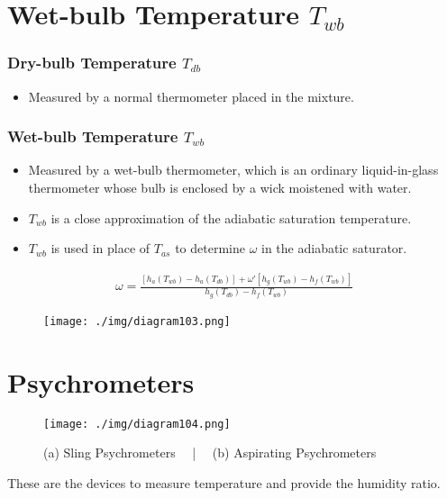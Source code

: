 \section{Wet-bulb Temperature $T_{wb}$}
\subsubsection{Dry-bulb Temperature $T_{db}$}
\begin{itemize}[noitemsep]
  \item Measured by a normal thermometer placed in the mixture.
\end{itemize}
\subsubsection{Wet-bulb Temperature $T_{wb}$}
\begin{itemize}[noitemsep]
  \item Measured by a wet-bulb thermometer, which is an ordinary liquid-in-glass thermometer whose bulb is enclosed by a wick moistened with water.
  \item $T_{wb}$ is a close approximation of the adiabatic saturation temperature.
  \item $T_{wb}$ is used in place of $T_{as}$ to determine $\omega$ in the adiabatic saturator.
\end{itemize}
\begin{gather}
  \omega = \frac{[h_a(T_{wb}) - h_a(T_{db})] + \omega'[h_g(T_{wb}) - h_f(T_{wb})]}{h_g(T_{db}) - h_f(T_{wb})}
\end{gather}
\begin{figure}[H]
  \centering
  \texttt{[image: ./img/diagram103.png]}
  \caption{}
\end{figure}
\section{Psychrometers}
\begin{figure}[H]
  \centering
  \texttt{[image: ./img/diagram104.png]}
  \caption{(a) Sling Psychrometers \ \ | \ \ (b) Aspirating Psychrometers}
\end{figure}
These are the devices to measure temperature and provide the humidity ratio.